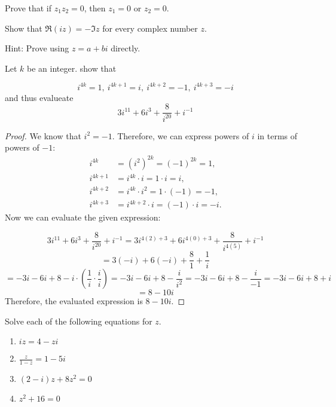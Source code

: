 \begin{exercise}
    Prove that if $z_1z_2=0$, then $z_1=0$ or $z_2=0$.
\end{exercise}

\begin{exercise}
    Show that \(\Re(i z) = -\Im z\) for every complex number \(z\).
\end{exercise}
Hint: Prove using $z=a+bi$ directly.

\begin{exercise}
    Let $\displaystyle k$ be an integer. show that

\begin{equation*}
i^{4k} =1,\ i^{4k+1} =i,\ i^{4k+2} =-1,\ i^{4k+3} =-i
\end{equation*}
and thus evalueate
\begin{equation*}
3i^{11} +6i^{3} +\frac{8}{i^{20}} +i^{-1}
\end{equation*}
\end{exercise}
\begin{proof}
    We know that \( i^2 = -1 \). Therefore, we can express powers of \( i \) in terms of powers of \( -1 \):
\begin{align*}
i^{4k} &= (i^2)^{2k} = (-1)^{2k} = 1, \\
i^{4k+1} &= i^{4k} \cdot i = 1 \cdot i = i, \\
i^{4k+2} &= i^{4k} \cdot i^2 = 1 \cdot (-1) = -1, \\
i^{4k+3} &= i^{4k+2} \cdot i = (-1) \cdot i = -i.
\end{align*}
Now we can evaluate the given expression:

\[
3i^{11} + 6i^3 + \frac{8}{i^{20}} + i^{-1} = 3i^{4(2)+3} + 6i^{4(0)+3} + \frac{8}{i^{4(5)}} + i^{-1}
\]
\[
= 3(-i) + 6(-i) + \frac{8}{1} + \frac{1}{i}
\]
\[
= -3i - 6i + 8 - i \cdot \left( \frac{1}{i} \cdot \frac{i}{i} \right) = -3i - 6i + 8 - \frac{i}{i^2} = -3i - 6i + 8 - \frac{i}{-1} = -3i - 6i + 8 + i
\]
\[
= 8 - 10i
\]
Therefore, the evaluated expression is \( 8 - 10i \).
\end{proof}

\begin{exercise}
    Solve each of the following equations for \( z \).
    \begin{enumerate}[label=(\alph*)]
        \item \( iz = 4 - zi \)
        \item \( \frac{z}{1 - z} = 1 - 5i \)
        \item \( (2 - i)z + 8z^2 = 0 \)
        \item \( z^2 + 16 = 0 \)
    \end{enumerate}
\end{exercise}


